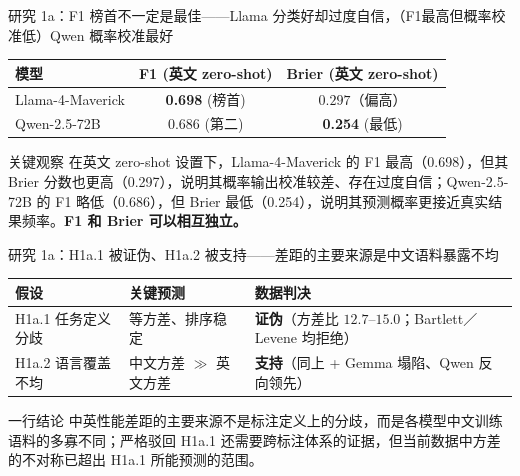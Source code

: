\documentclass[aspectratio=169,professionalfonts]{beamer}
\begin{document}
\begin{frame}{研究 1a：F1 榜首不一定是最佳——Llama 分类好却过度自信，（F1最高但概率校准低）Qwen 概率校准最好}
  \footnotesize
  \begin{table}
    \centering
    \setlength{\tabcolsep}{5pt}
    \begin{tabular}{lcc}
      \toprule
      模型 & F1 (英文 zero-shot) & Brier (英文 zero-shot) \\
      \midrule
      Llama-4-Maverick & \textbf{0.698} (榜首) & $0.297$（偏高） \\
      Qwen-2.5-72B     & $0.686$ (第二)        & \textbf{0.254} (最低) \\
      \bottomrule
    \end{tabular}
  \end{table}

  \vspace{0.4em}
  \begin{block}{关键观察}
    \small 在英文 zero-shot 设置下，Llama-4-Maverick 的 F1 最高（0.698），但其 Brier 分数也更高（0.297），说明其概率输出校准较差、存在过度自信；Qwen-2.5-72B 的 F1 略低（0.686），但 Brier 最低（0.254），说明其预测概率更接近真实结果频率。\textbf{F1 和 Brier 可以相互独立。}
  \end{block}
\end{frame}

\begin{frame}{研究 1a：H1a.1 被证伪、H1a.2 被支持——差距的主要来源是中文语料暴露不均}
  \small
  \begin{table}
    \centering
    \setlength{\tabcolsep}{4pt}
    \begin{tabular}{lll}
      \toprule
      假设 & 关键预测 & 数据判决 \\
      \midrule
      H1a.1 任务定义分歧 & 等方差、排序稳定 & \textbf{证伪}（方差比 $12.7$--$15.0$；Bartlett／Levene 均拒绝） \\
      H1a.2 语言覆盖不均 & 中文方差 $\gg$ 英文方差 & \textbf{支持}（同上 + Gemma 塌陷、Qwen 反向领先） \\
      \bottomrule
    \end{tabular}
  \end{table}

  \vspace{0.4em}
  \begin{block}{一行结论}
    \small 中英性能差距的主要来源不是标注定义上的分歧，而是各模型中文训练语料的多寡不同；严格驳回 H1a.1 还需要跨标注体系的证据，但当前数据中方差的不对称已超出 H1a.1 所能预测的范围。
  \end{block}
\end{frame}
\end{document}
